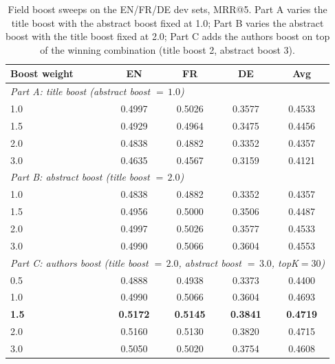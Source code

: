 \begin{table}[!ht]
    \caption{Field boost sweeps on the EN/FR/DE dev sets, MRR@5. Part A varies the title boost with the abstract boost fixed at 1.0; Part B varies the abstract boost with the title boost fixed at 2.0; Part C adds the authors boost on top of the winning combination (title boost 2, abstract boost 3).}
    \label{tab:field-boosts}
    \centering
    \begin{tabular}{lcccc}
        \toprule
        Boost weight & EN & FR & DE & Avg \\
        \midrule
        \multicolumn{5}{l}{\textit{Part A: title boost (abstract boost ${=}\,1.0$)}} \\
        1.0              & 0.4997 & 0.5026 & 0.3577 & 0.4533 \\
        1.5              & 0.4929 & 0.4964 & 0.3475 & 0.4456 \\
        2.0              & 0.4838 & 0.4882 & 0.3352 & 0.4357 \\
        3.0              & 0.4635 & 0.4567 & 0.3159 & 0.4121 \\
        \midrule
        \multicolumn{5}{l}{\textit{Part B: abstract boost (title boost ${=}\,2.0$)}} \\
        1.0              & 0.4838 & 0.4882 & 0.3352 & 0.4357 \\
        1.5              & 0.4956 & 0.5000 & 0.3506 & 0.4487 \\
        2.0              & 0.4997 & 0.5026 & 0.3577 & 0.4533 \\
        3.0              & 0.4990 & 0.5066 & 0.3604 & 0.4553 \\
        \midrule
        \multicolumn{5}{l}{\textit{Part C: authors boost (title boost ${=}\,2.0$, abstract boost ${=}\,3.0$, topK${=}30$)}} \\
        0.5              & 0.4888 & 0.4938 & 0.3373 & 0.4400 \\
        1.0              & 0.4990 & 0.5066 & 0.3604 & 0.4693 \\
        \textbf{1.5}     & \textbf{0.5172} & \textbf{0.5145} & \textbf{0.3841} & \textbf{0.4719} \\
        2.0              & 0.5160 & 0.5130 & 0.3820 & 0.4715 \\
        3.0              & 0.5050 & 0.5020 & 0.3754 & 0.4608 \\
        \bottomrule
    \end{tabular}
\end{table}

